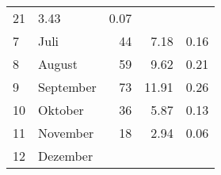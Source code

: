 \begin{longtable}{lXrrr}
       \num{21} &
       \num[round-mode=places,round-precision=2]{3.43} &
         \num[round-mode=places,round-precision=2]{0.07} \\

     7 &
     \multicolumn{1}{X}{ Juli   } &


       \num{44} &
       \num[round-mode=places,round-precision=2]{7.18} &
         \num[round-mode=places,round-precision=2]{0.16} \\

     8 &
     \multicolumn{1}{X}{ August   } &


       \num{59} &
       \num[round-mode=places,round-precision=2]{9.62} &
         \num[round-mode=places,round-precision=2]{0.21} \\

     9 &
     \multicolumn{1}{X}{ September   } &


       \num{73} &
       \num[round-mode=places,round-precision=2]{11.91} &
         \num[round-mode=places,round-precision=2]{0.26} \\

     10 &
     \multicolumn{1}{X}{ Oktober   } &


       \num{36} &
       \num[round-mode=places,round-precision=2]{5.87} &
         \num[round-mode=places,round-precision=2]{0.13} \\

     11 &
     \multicolumn{1}{X}{ November   } &


       \num{18} &
       \num[round-mode=places,round-precision=2]{2.94} &
         \num[round-mode=places,round-precision=2]{0.06} \\

     12 &
     \multicolumn{1}{X}{ Dezember   } &



\end{longtable}
